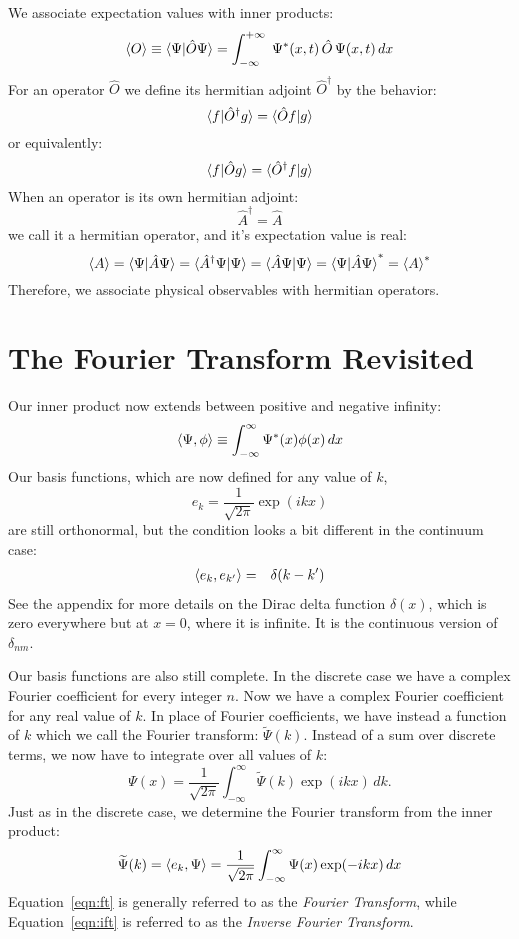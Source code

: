 \documentclass[12pt]{book}
\begin{document}
We associate expectation values with inner products:
$$\braket{O} \equiv \braket{\Psi|\hat{O}\Psi} = \int_{-\infty}^{+\infty}\; \Psi^*(x,t) \, \hat{O} \, \Psi(x,t) \, dx$$
For an operator $\hat{O}$ we define its hermitian adjoint $\hat{O}^\dagger$ by the behavior:
$$\braket{f|\hat{O}^\dagger g} = \braket{\hat{O} f| g}$$
or equivalently:
$$\braket{f|\hat{O} g} = \braket{\hat{O}^\dagger f| g}$$
When an operator is its own hermitian adjoint:
$$\hat{A}^\dagger = \hat{A}$$
we call it a hermitian operator, and it's expectation value is real:
$$\braket{A} = \braket{\Psi|\hat{A}\Psi} = \braket{\hat{A}^\dagger \Psi|\Psi}=\braket{\hat{A}\Psi|\Psi}=\braket{\Psi|\hat{A}\Psi}^* = \braket{A}^*$$
Therefore, we associate physical observables with hermitian operators.






\section{The Fourier Transform Revisited}

Our inner product now extends between positive and negative infinity:
\begin{equation}
\braket{\Psi, \phi} \equiv \int_{-\infty}^{\infty} \Psi^*(x) \phi(x) \, dx
\end{equation}
Our basis functions, which are now defined for any value of $k$,
\begin{equation}
e_k = \frac{1}{\sqrt{2\pi}} \exp(i k x)
\end{equation}
are still orthonormal, but the condition looks a bit different in the continuum case:
\begin{eqnarray*}
\braket{e_k, e_{k'}} &=& \delta(k-k')
\end{eqnarray*}
See the appendix for more details on the Dirac delta function $\delta(x)$, which is zero everywhere but at $x=0$, where it is infinite.  It is the continuous version of $\delta_{nm}$.

Our basis functions are also still complete.  In the discrete case we have a complex Fourier coefficient for every integer $n$.   Now we have a complex Fourier coefficient for any real value of $k$.  In place of Fourier coefficients, we have instead a function of $k$ which we call the Fourier transform: $\widetilde{\Psi}(k)$.
Instead of a sum over discrete terms, we now have to integrate over all values of $k$:
\begin{equation} \label{eqn:ift}
\Psi(x) = \frac{1}{\sqrt{2\pi}} \int_{-\infty}^{\infty} \widetilde{\Psi}(k) \exp(ikx) \, dk.
\end{equation}
Just as in the discrete case, we determine the Fourier transform from the inner product:
\begin{equation} \label{eqn:ft}
\widetilde{\Psi}(k) = \braket{e_k, \Psi} = \frac{1}{\sqrt{2\pi}} \int_{-\infty}^{\infty} {\Psi}(x) \exp(-ikx) \, dx
\end{equation}
Equation~\ref{eqn:ft} is generally referred to as the {\em Fourier Transform}, while Equation~\ref{eqn:ift} is referred to as the {\em Inverse Fourier Transform}.
\end{document}
